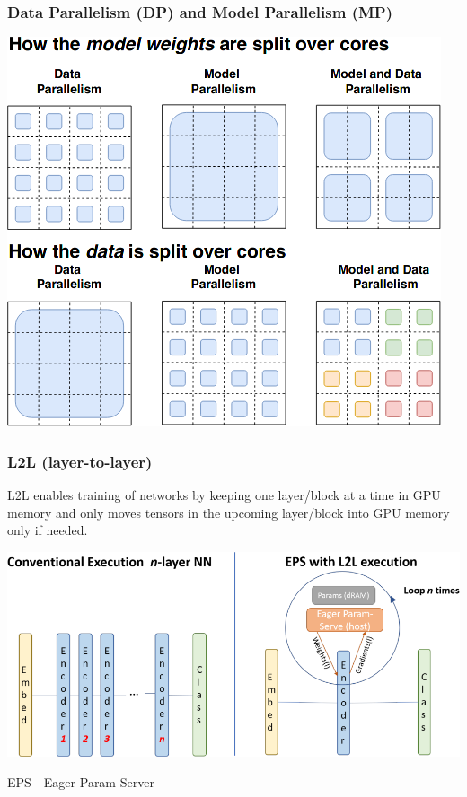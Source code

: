 \documentclass{beamer}
\begin{document}
\begin{frame}
    \frametitle{Data Parallelism (DP) and Model Parallelism (MP)}
    \begin{center}
        \includegraphics[scale=0.42]{img/data_distribution.png}
    \end{center}
\end{frame}

\begin{frame}
    \frametitle{L2L (layer-to-layer)}
    L2L enables training of networks by keeping one layer/block at a time in GPU memory and only moves tensors in the upcoming layer/block into GPU memory only if needed.
    \begin{center}
        \includegraphics[scale=1.3]{img/L2L.png}

        \tiny{EPS - Eager Param-Server}
    \end{center}
\end{frame}
\end{document}
